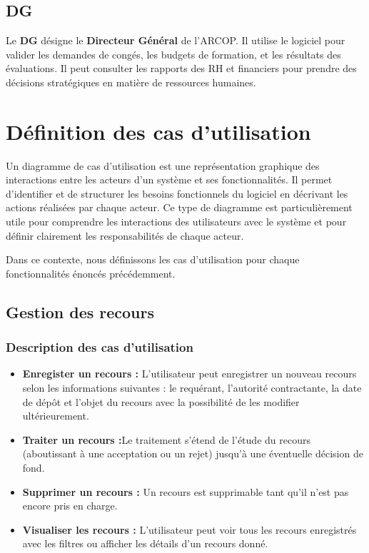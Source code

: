 \subsection{DG}
Le \textbf{DG} désigne le \textbf{Directeur Général} de l'\ac{ARCOP}. Il utilise le logiciel pour valider les demandes de congés, les budgets de formation, et les résultats des évaluations. Il peut consulter les rapports des \ac{RH} et financiers pour prendre des décisions stratégiques en matière de ressources humaines.


\section{D\'efinition des cas d'utilisation}

Un diagramme de cas d'utilisation est une représentation graphique des interactions entre les acteurs d'un système et ses fonctionnalités. Il permet d'identifier et de structurer les besoins fonctionnels du logiciel en décrivant les actions réalisées par chaque acteur. Ce type de diagramme est particulièrement utile pour comprendre les interactions des utilisateurs avec le système et pour définir clairement les responsabilités de chaque acteur.

Dans ce contexte, nous définissons les cas d'utilisation pour chaque fonctionnalités énoncés précédemment.
\subsection{Gestion des recours}
\subsubsection{Description des cas d'utilisation}
\begin{itemize}
    \item \textbf{Enregister un recours :} L'utilisateur peut enregistrer un nouveau recours selon les informations suivantes : le requérant, l'autorité contractante, la date de dépôt et l'objet du recours avec la possibilité de les modifier ultérieurement.
    \item \textbf{Traiter un recours :}Le traitement s'étend de l'étude du recours (aboutissant à une acceptation ou un rejet) jusqu'à une éventuelle décision de fond.
    \item \textbf{Supprimer un recours :} Un recours est supprimable tant qu'il n'est pas encore pris en charge. 
    \item \textbf{Visualiser les recours :} L'utilisateur peut voir tous les recours enregistrés avec les filtres ou afficher les détails d'un recours donné.
   
\end{itemize}
